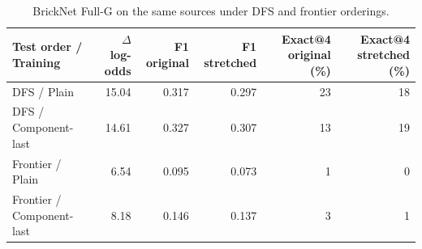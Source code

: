 \begin{table}[htbp]
\centering\small
\caption{BrickNet Full-G on the same sources under DFS and frontier orderings.}
\begin{tabular}{@{}lrrrrr@{}}\toprule
Test order / Training & $\Delta$ log-odds & F1 original & F1 stretched & Exact@4 original (\%) & Exact@4 stretched (\%) \\
\midrule
DFS / Plain & 15.04 & 0.317 & 0.297 & 23 & 18 \\
DFS / Component-last & 14.61 & 0.327 & 0.307 & 13 & 19 \\
Frontier / Plain & 6.54 & 0.095 & 0.073 & 1 & 0 \\
Frontier / Component-last & 8.18 & 0.146 & 0.137 & 3 & 1 \\
\bottomrule\end{tabular}
\end{table}
